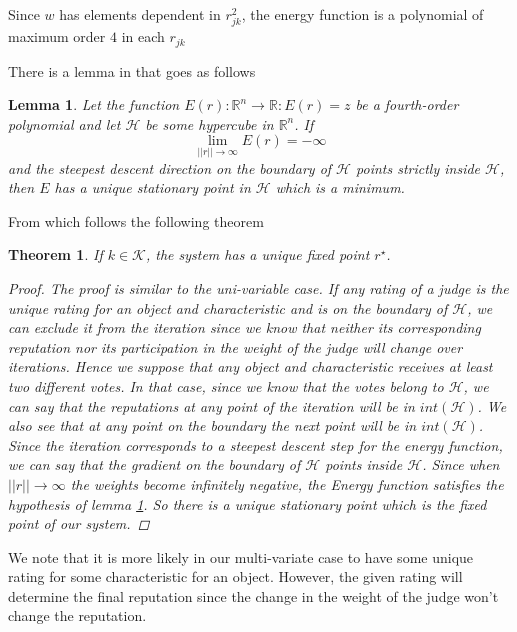 \documentclass[12pt,a4paper]{article}
\newtheorem{lemma}{Lemma}
\newtheorem{theorem}{Theorem}
\begin{document}
 Since $w$ has elements dependent in $r_{jk}^2$, the energy function is a polynomial of maximum order $4$ in each $r_{jk}$

There is a lemma in \cite{Cristo1} that goes as follows
\begin{lemma}
Let the function $E(r) : \mathbb{R}^n \rightarrow \mathbb{R} : E(r) = z $ be a fourth-order polynomial and let $\mathcal{H}$ be some hypercube in $\mathbb{R}^n$. If 
$$\lim_{||r||\rightarrow \infty} E(r) = - \infty $$
and the steepest descent direction on the boundary of $\mathcal{H}$ points strictly inside $\mathcal{H}$, then $E$ has a unique stationary point in $\mathcal{H}$ which is a minimum.
\label{eq:poly}
\end{lemma}
From which follows the following theorem
\begin{theorem}
If $k \in \mathcal{K}$, the system has a unique fixed point $r^{\star}$.\label{thm:uni}
\begin{proof}
The proof is similar to the uni-variable case. If any rating of a judge is the unique rating for an object and characteristic and is on the boundary of $\mathcal{H}$, we can exclude it from the iteration since we know that neither its corresponding reputation nor its participation in the weight of the judge will change over iterations. Hence we suppose that any object and characteristic receives at least two different votes. In that case, since we know that the votes belong to $\mathcal{H}$, we can say that the reputations at any point of the iteration will be in $int(\mathcal{H})$.
We also see that at any point on the boundary the next point will be in $int(\mathcal{H})$. Since the iteration corresponds to a steepest descent step for the energy function, we can say that the gradient on the boundary of $\mathcal{H}$ points inside $\mathcal{H}$. Since when $||r|| \rightarrow \infty$ the weights become infinitely negative, the Energy function satisfies the hypothesis of lemma \ref{eq:poly}. So there is a unique stationary point which is the fixed point of our system.
\end{proof}

\end{theorem}
We note that it is more likely in our multi-variate case to have some unique rating for some characteristic for an object. However, the given rating will determine the final reputation since the change in the weight of the judge won't change the reputation.
\end{document}
